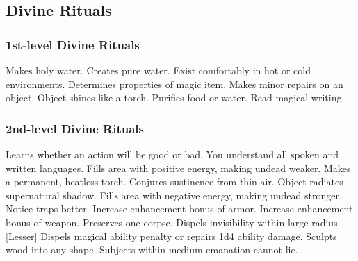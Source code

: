 \subsection{Divine Rituals}\label{Divine Rituals}
\subsubsection{1st-level Divine Rituals}
\begin{rituallist}
     Makes holy water.
     Creates pure water.
     Exist comfortably in hot or cold environments.
     Determines properties of magic item.
     Makes minor repairs on an object.
     Object shines like a torch.
     Purifies food or water.
     Read magical writing.
\end{rituallist}

\subsubsection{2nd-level Divine Rituals}
\begin{rituallist}
    \M\F Learns whether an action will be good or bad.
     You understand all spoken and written languages.
     Fills area with positive energy, making undead weaker.
     Makes a permanent, heatless torch.
     Conjures sustinence from thin air.
     Object radiates supernatural shadow.
     Fills area with negative energy, making undead stronger.
     Notice traps better.
     Increase enhancement bonus of armor.
     Increase enhancement bonus of weapon.
     Preserves one corpse.
     Dispels invisibility within large radius.
    [Lesser] Dispels magical ability penalty or repairs 1d4 ability damage.
     Sculpts wood into any shape.
     Subjects within medium emanation cannot lie.
\end{rituallist}


